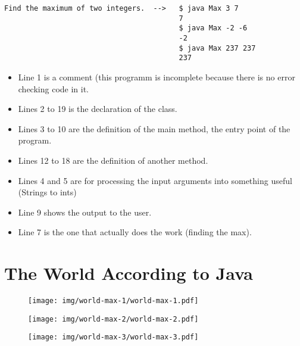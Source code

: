 \documentclass[8pt, a4paper, oneside]{extarticle}
\begin{document}
\begin{Verbatim}
Find the maximum of two integers.  -->   $ java Max 3 7
                                         7
                                         $ java Max -2 -6
                                         -2
                                         $ java Max 237 237
                                         237
\end{Verbatim}
\newpage
\begin{multicols}{2}
\columnbreak

\begin{itemize}

  \item Line 1 is a comment (this programm is incomplete because there is no
    error checking code in it.

  \item Lines 2 to 19 is the declaration of the class.

  \item Lines 3 to 10 are the definition of the main method, the entry point of
    the program.

  \item Lines 12 to 18 are the definition of another method.

  \item Lines 4 and 5 are for processing the input arguments into something
    useful (Strings to ints)

  \item Line 9 shows the output to the user.

  \item Line 7 is the one that actually does the work (finding the max).

\end{itemize}

\end{multicols}

\section{The World According to Java}

\begin{figure}[!ht]
  \centering
  \texttt{[image: img/world-max-1/world-max-1.pdf]}
\end{figure}
\begin{figure}[!ht]
  \centering
  \begin{minipage}{.5\textwidth}
    \centering
    \texttt{[image: img/world-max-2/world-max-2.pdf]}
  \end{minipage}%
  \begin{minipage}{.5\textwidth}
    \centering
    \texttt{[image: img/world-max-3/world-max-3.pdf]}
  \end{minipage}
\end{figure}
\end{document}
